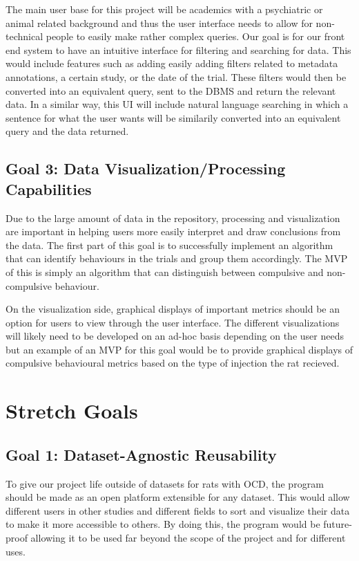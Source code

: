 \documentclass{article}
\begin{document}
  \par{The main user base for this project will be academics with a psychiatric or
  animal related background and thus the user interface needs to allow for non-technical
  people to easily make rather complex queries. Our goal is for our front end system to have an intuitive
  interface for filtering and searching for data. This would include features such as adding easily adding filters related to metadata annotations, a certain study,
  or the date of the trial. These filters would then be converted into an equivalent query, sent to the DBMS and return the relevant data. In a similar way,
  this UI will include natural language searching in which a sentence for what the user wants will be similarily converted into an equivalent query and the data returned.}

 \subsection{Goal 3: Data Visualization/Processing Capabilities} 
 
 \par{Due to the large amount of data in the repository, processing and visualization are important in
  helping users more easily interpret and draw conclusions from the data. The first part of this goal is to successfully implement an algorithm that
  can identify behaviours in the trials and group them accordingly. The MVP of this is simply an algorithm that can distinguish between compulsive and non-compulsive
  behaviour.
  
  On the visualization side, graphical displays of important metrics should be an option for users to view through the user interface. The different
  visualizations will likely need to be developed on an ad-hoc basis depending on the user needs but an example of an MVP for this goal would be to provide graphical
  displays of compulsive behavioural metrics based on the type of injection the rat recieved.}


\section{Stretch Goals}

  \subsection{Goal 1: Dataset-Agnostic Reusability}
  
  \par{To give our project life outside of datasets for rats with OCD, the program should be made as an open platform extensible for any dataset. This would allow different users in other studies and different fields to sort and visualize their data to make it more accessible to others. By doing this, the program would be future-proof allowing it to be used far beyond the scope of the project and for different uses.}
\end{document}
